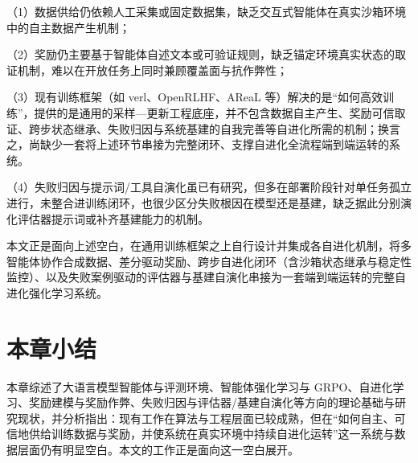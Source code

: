 （1）数据供给仍依赖人工采集或固定数据集，缺乏交互式智能体在真实沙箱环境中的自主数据产生机制；

（2）奖励仍主要基于智能体自述文本或可验证规则，缺乏锚定环境真实状态的取证机制，难以在开放任务上同时兼顾覆盖面与抗作弊性；

（3）现有训练框架（如 verl、OpenRLHF、AReaL 等）解决的是“如何高效训练”，提供的是通用的采样—更新工程底座，并不包含数据自主产生、奖励可信取证、跨步状态继承、失败归因与系统基建的自我完善等自进化所需的机制；换言之，尚缺少一套将上述环节串接为完整闭环、支撑自进化全流程端到端运转的系统。

（4）失败归因与提示词/工具自演化虽已有研究，但多在部署阶段针对单任务孤立进行，未整合进训练闭环，也很少区分失败根因在模型还是基建，缺乏据此分别演化评估器提示词或补齐基建能力的机制。

本文正是面向上述空白，在通用训练框架之上自行设计并集成各自进化机制，将多智能体协作合成数据、差分驱动奖励、跨步自进化闭环（含沙箱状态继承与稳定性监控）、以及失败案例驱动的评估器与基建自演化串接为一套端到端运转的完整自进化强化学习系统。

\section{本章小结}

本章综述了大语言模型智能体与评测环境、智能体强化学习与 GRPO、自进化学习、奖励建模与奖励作弊、失败归因与评估器/基建自演化等方向的理论基础与研究现状，并分析指出：现有工作在算法与工程层面已较成熟，但在“如何自主、可信地供给训练数据与奖励，并使系统在真实环境中持续自进化运转”这一系统与数据层面仍有明显空白。本文的工作正是面向这一空白展开。